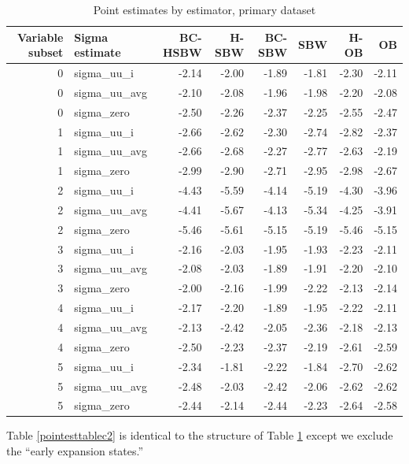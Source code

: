 \documentclass[12pt]{article}
\begin{document}
\begin{table}[ht]
\begin{tabular}{rlrrrrrr}
  \toprule
Variable subset & Sigma estimate & BC-HSBW & H-SBW & BC-SBW & SBW & H-OB & OB \\ 
  \midrule
0 & sigma\_uu\_i & -2.14 & -2.00 & -1.89 & -1.81 & -2.30 & -2.11 \\ 
  0 & sigma\_uu\_avg & -2.10 & -2.08 & -1.96 & -1.98 & -2.20 & -2.08 \\ 
  0 & sigma\_zero & -2.50 & -2.26 & -2.37 & -2.25 & -2.55 & -2.47 \\ 
  1 & sigma\_uu\_i & -2.66 & -2.62 & -2.30 & -2.74 & -2.82 & -2.37 \\ 
  1 & sigma\_uu\_avg & -2.66 & -2.68 & -2.27 & -2.77 & -2.63 & -2.19 \\ 
  1 & sigma\_zero & -2.99 & -2.90 & -2.71 & -2.95 & -2.98 & -2.67 \\ 
  2 & sigma\_uu\_i & -4.43 & -5.59 & -4.14 & -5.19 & -4.30 & -3.96 \\ 
  2 & sigma\_uu\_avg & -4.41 & -5.67 & -4.13 & -5.34 & -4.25 & -3.91 \\ 
  2 & sigma\_zero & -5.46 & -5.61 & -5.15 & -5.19 & -5.46 & -5.15 \\ 
  3 & sigma\_uu\_i & -2.16 & -2.03 & -1.95 & -1.93 & -2.23 & -2.11 \\ 
  3 & sigma\_uu\_avg & -2.08 & -2.03 & -1.89 & -1.91 & -2.20 & -2.10 \\ 
  3 & sigma\_zero & -2.00 & -2.16 & -1.99 & -2.22 & -2.13 & -2.14 \\ 
  4 & sigma\_uu\_i & -2.17 & -2.20 & -1.89 & -1.95 & -2.22 & -2.11 \\ 
  4 & sigma\_uu\_avg & -2.13 & -2.42 & -2.05 & -2.36 & -2.18 & -2.13 \\ 
  4 & sigma\_zero & -2.50 & -2.23 & -2.37 & -2.19 & -2.61 & -2.59 \\ 
  5 & sigma\_uu\_i & -2.34 & -1.81 & -2.22 & -1.84 & -2.70 & -2.62 \\ 
  5 & sigma\_uu\_avg & -2.48 & -2.03 & -2.42 & -2.06 & -2.62 & -2.62 \\ 
  5 & sigma\_zero & -2.44 & -2.14 & -2.44 & -2.23 & -2.64 & -2.58 \\ 
   \bottomrule
\end{tabular}
\label{pointesttable}
\caption{Point estimates by estimator, primary dataset}
\end{table}

Table \ref{pointesttablec2} is identical to the structure of Table \ref{pointesttable} except we exclude the ``early expansion states.''
\end{document}
